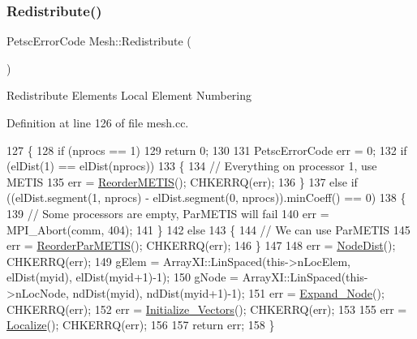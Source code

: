 \subsubsection{\texorpdfstring{Redistribute()}{Redistribute()}}
{\footnotesize\ttfamily Petsc\+Error\+Code Mesh\+::\+Redistribute (\begin{DoxyParamCaption}{ }\end{DoxyParamCaption})}

Redistribute Elements Local Element Numbering 

Definition at line 126 of file mesh.\+cc.


\begin{DoxyCode}
127 \{
128   \textcolor{keywordflow}{if} (nprocs == 1)
129     \textcolor{keywordflow}{return} 0;
130 
131   PetscErrorCode err = 0;
132   \textcolor{keywordflow}{if} (elDist(1) == elDist(nprocs))
133   \{
134     \textcolor{comment}{// Everything on processor 1, use METIS}
135     err = \mbox{\hyperlink{class_mesh_a0ab1f20471ff5deed8803597b979779d}{ReorderMETIS}}(); CHKERRQ(err);
136   \}
137   \textcolor{keywordflow}{else} \textcolor{keywordflow}{if} ((elDist.segment(1, nprocs) - elDist.segment(0, nprocs)).minCoeff() == 0)
138   \{
139     \textcolor{comment}{// Some processors are empty, ParMETIS will fail}
140     err = MPI\_Abort(comm, 404);
141   \}
142   \textcolor{keywordflow}{else}
143   \{
144     \textcolor{comment}{// We can use ParMETIS}
145     err = \mbox{\hyperlink{class_mesh_ab9c61b0cf7cbcb8738d0e904fe532e91}{ReorderParMETIS}}(); CHKERRQ(err);
146   \}
147 
148   err = \mbox{\hyperlink{class_mesh_aa6b19f4fdf210f8937694e8c7d30ea15}{NodeDist}}(); CHKERRQ(err);
149   gElem = ArrayXI::LinSpaced(this->nLocElem, elDist(myid), elDist(myid+1)-1);
150   gNode = ArrayXI::LinSpaced(this->nLocNode, ndDist(myid), ndDist(myid+1)-1);
151   err = \mbox{\hyperlink{class_mesh_a1930d80c707de6d202dac7cef0022257}{Expand\_Node}}(); CHKERRQ(err);
152   err = \mbox{\hyperlink{class_mesh_af9e180bd8adb9c495e6c38840ea19f10}{Initialize\_Vectors}}(); CHKERRQ(err);
153 
155   err = \mbox{\hyperlink{class_mesh_a54a12376bf99f4f4991af01fc23c9c09}{Localize}}(); CHKERRQ(err);
156 
157   \textcolor{keywordflow}{return} err;
158 \}
\end{DoxyCode}
\mbox{\label{class_mesh_a0ab1f20471ff5deed8803597b979779d}} 
